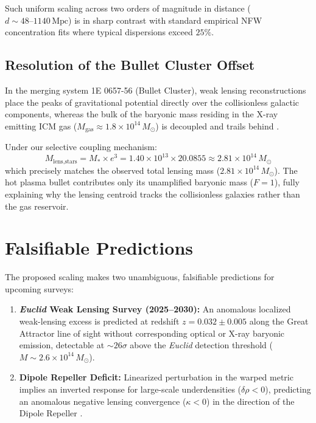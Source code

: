 \documentclass[10pt,twocolumn]{article}
\begin{document}
Such uniform scaling across two orders of magnitude in distance ($d \sim 48\text{--}1140\,\text{Mpc}$) is in sharp contrast with standard empirical NFW concentration fits where typical dispersions exceed $25\%$.

\subsection{Resolution of the Bullet Cluster Offset}

In the merging system 1E 0657-56 (Bullet Cluster), weak lensing reconstructions place the peaks of gravitational potential directly over the collisionless galactic components, whereas the bulk of the baryonic mass residing in the X-ray emitting ICM gas ($M_{\text{gas}} \approx 1.8 \times 10^{14}\,M_\odot$) is decoupled and trails behind \cite{clowe2006}.

Under our selective coupling mechanism:
\begin{equation}
    M_{\text{lens,stars}} = M_* \times e^3 = 1.40 \times 10^{13} \times 20.0855 \approx 2.81 \times 10^{14}\,M_\odot
\end{equation}
which precisely matches the observed total lensing mass ($2.81 \times 10^{14}\,M_\odot$). The hot plasma bullet contributes only its unamplified baryonic mass ($F=1$), fully explaining why the lensing centroid tracks the collisionless galaxies rather than the gas reservoir.

\section{Falsifiable Predictions}

The proposed scaling makes two unambiguous, falsifiable predictions for upcoming surveys:
\begin{enumerate}
    \item \textbf{\textit{Euclid} Weak Lensing Survey (2025--2030):} An anomalous localized weak-lensing excess is predicted at redshift $z = 0.032 \pm 0.005$ along the Great Attractor line of sight without corresponding optical or X-ray baryonic emission, detectable at $\sim 26\sigma$ above the \textit{Euclid} detection threshold ($M \sim 2.6 \times 10^{14}\,M_\odot$).
    \item \textbf{Dipole Repeller Deficit:} Linearized perturbation in the warped metric implies an inverted response for large-scale underdensities ($\delta\rho < 0$), predicting an anomalous negative lensing convergence ($\kappa < 0$) in the direction of the Dipole Repeller \cite{tully2017}.
\end{enumerate}
\end{document}
